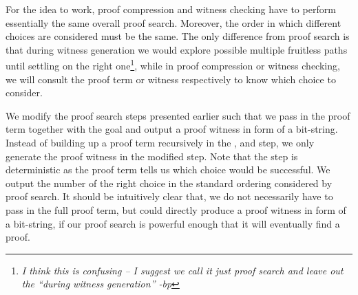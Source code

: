 \documentclass{acmconf}
\newcommand{\ednote}[1]{\footnote{\it #1}}
\begin{document}

For the idea to work, proof compression and witness checking have to
perform essentially the same overall proof search. Moreover, the order
in which different choices are considered must be the same.  The only
difference from proof search is that during witness generation we
would explore possible multiple fruitless paths until settling on the
right one\ednote{I think this is confusing -- I suggest we call it just proof
  search and leave out the ``during witness generation'' -bp}, while
in proof compression or witness checking, we will consult the proof
term or witness respectively to know which choice to consider.

We modify the proof search steps presented earlier such that we pass
in the proof term together with the goal and output a proof witness in
form of a bit-string. Instead of building up a proof term recursively
in the {}, {} and {} step, we
only generate the proof witness in the modified {} step.
Note that the {} step is deterministic as the proof term
tells us which choice would be successful. We output the number of the
right choice in the standard ordering considered by proof search. It
should be intuitively clear that, we do not necessarily have to pass
in the full proof term, but could directly produce a proof witness in
form of a bit-string, if our proof search is powerful enough that it
will eventually find a proof.
\end{document}
